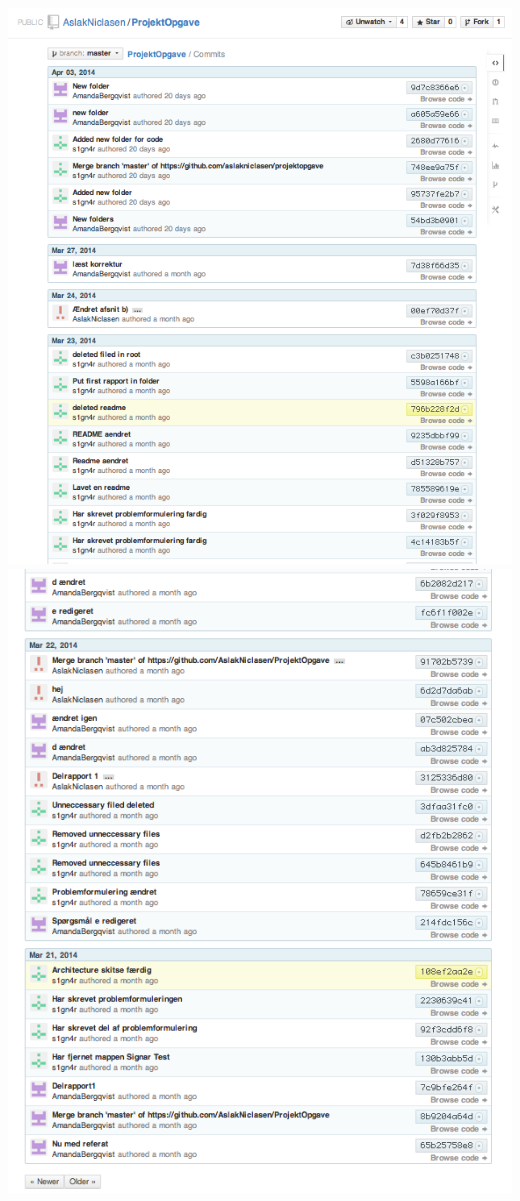 \documentclass[a4paper,12pt]{article}
\begin{document}
\newpage
\includegraphics[width=\linewidth]{log3.png}
\newpage
\includegraphics[width=\linewidth]{log4.png}
\end{document}

